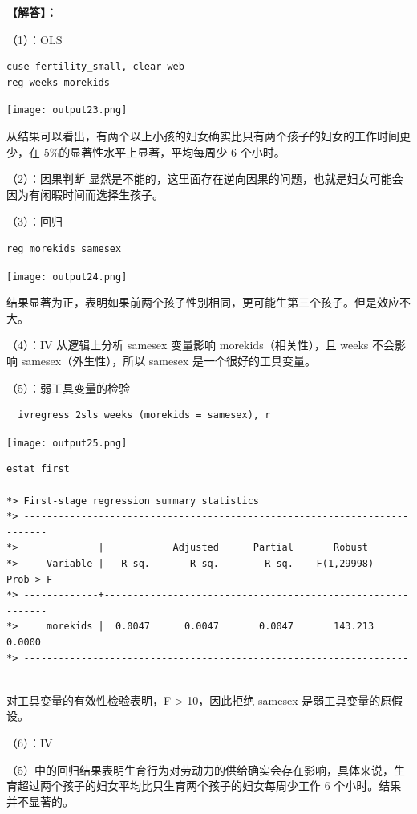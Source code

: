 \documentclass[cn,fancy,blue,11pt]{elegantbook}
\begin{document}
\textbf{【解答】：}

（1）：OLS

\begin{lstlisting}
cuse fertility_small, clear web
reg weeks morekids
\end{lstlisting}

\noindent\texttt{[image: output23.png]}

从结果可以看出，有两个以上小孩的妇女确实比只有两个孩子的妇女的工作时间更少，在 5\%的显著性水平上显著，平均每周少 6 个小时。

（2）：因果判断
显然是不能的，这里面存在逆向因果的问题，也就是妇女可能会因为有闲暇时间而选择生孩子。

（3）：回归

\begin{lstlisting}
reg morekids samesex
\end{lstlisting}

\noindent\texttt{[image: output24.png]}

结果显著为正，表明如果前两个孩子性别相同，更可能生第三个孩子。但是效应不大。

（4）：IV
从逻辑上分析 samesex 变量影响 morekids（相关性），且 weeks 不会影响 samesex（外生性），所以 samesex 是一个很好的工具变量。

（5）：弱工具变量的检验

\begin{lstlisting}
  ivregress 2sls weeks (morekids = samesex), r
\end{lstlisting}

\noindent\texttt{[image: output25.png]}

\begin{lstlisting}
estat first

*> First-stage regression summary statistics
*> --------------------------------------------------------------------------
*>              |            Adjusted      Partial       Robust
*>     Variable |   R-sq.       R-sq.        R-sq.    F(1,29998)   Prob > F
*> -------------+------------------------------------------------------------
*>     morekids |  0.0047      0.0047       0.0047       143.213    0.0000
*> --------------------------------------------------------------------------
\end{lstlisting}

对工具变量的有效性检验表明，F \textgreater{} 10，因此拒绝 samesex 是弱工具变量的原假设。

（6）：IV

（5）中的回归结果表明生育行为对劳动力的供给确实会存在影响，具体来说，生育超过两个孩子的妇女平均比只生育两个孩子的妇女每周少工作 6 个小时。结果并不显著的。
\end{document}
